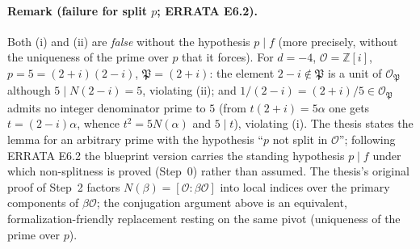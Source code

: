 \paragraph{Remark (failure for split $p$; ERRATA E6.2).}
Both (i) and (ii) are \emph{false} without the hypothesis $p \mid f$ (more
precisely, without the uniqueness of the prime over $p$ that it forces). For
$d = -4$, $\mathcal{O} = \mathbb{Z}[i]$, $p = 5 = (2+i)(2-i)$,
$\mathfrak{P} = (2+i)$: the element $2 - i \notin \mathfrak{P}$ is a unit of
$\mathcal{O}_{\mathfrak{P}}$ although $5 \mid N(2-i) = 5$, violating (ii); and
$1/(2-i) = (2+i)/5 \in \mathcal{O}_{\mathfrak{P}}$ admits no integer
denominator prime to $5$ (from $t(2+i) = 5\alpha$ one gets $t = (2-i)\alpha$,
whence $t^2 = 5N(\alpha)$ and $5 \mid t$), violating (i). The thesis states the
lemma for an arbitrary prime with the hypothesis ``$p$ not split in
$\mathcal{O}$''; following ERRATA E6.2 the blueprint version carries the
standing hypothesis $p \mid f$ under which non-splitness is proved (Step~0)
rather than assumed. The thesis's original proof of Step~2 factors
$N(\beta) = [\mathcal{O} : \beta\mathcal{O}]$ into local indices over the
primary components of $\beta\mathcal{O}$; the conjugation argument above is an
equivalent, formalization-friendly replacement resting on the same pivot
(uniqueness of the prime over $p$).
